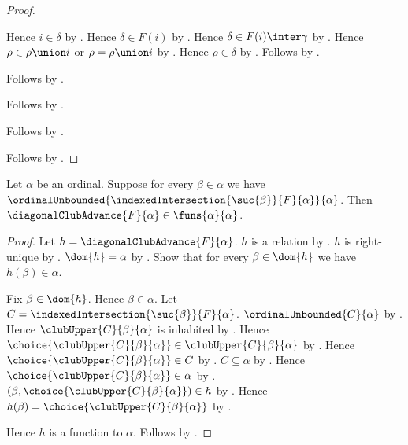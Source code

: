 \begin{proof}
\begin{subproof}
\begin{subproof}
\begin{subproof}
\begin{subproof}
                    Hence $i\in\delta$ by .
                    Hence $\delta\in F(i)$
                        by .
                    Hence $\delta\in F(i)\inter\gamma$
                        by .
                    Hence $\rho\in\rho\union i$ or $\rho=\rho\union i$
                        by .
                    Hence $\rho\in\delta$ by .
                    Follows by \auto.
                \end{subproof}
                Follows by .
            \end{subproof}
            Follows by .
        \end{subproof}
        Follows by .
    \end{subproof}
    Follows by .
\end{proof}

\begin{theorem}\label{diagonal_club_advance_type}
    Let $\alpha$ be an ordinal.
    Suppose for every $\beta\in\alpha$ we have
        $\ordinalUnbounded{
            \indexedIntersection{\suc{\beta}}{F}{\alpha}}{\alpha}$.
    Then $\diagonalClubAdvance{F}{\alpha}\in\funs{\alpha}{\alpha}$.
\end{theorem}
\begin{proof}
    Let $h=\diagonalClubAdvance{F}{\alpha}$.
    $h$ is a relation by .
    $h$ is right-unique
        by .
    $\dom{h}=\alpha$
        by .
    Show that for every $\beta\in\dom{h}$ we have $h(\beta)\in\alpha$.
    \begin{subproof}
        Fix $\beta\in\dom{h}$.
        Hence $\beta\in\alpha$.
        Let $C=\indexedIntersection{\suc{\beta}}{F}{\alpha}$.
        $\ordinalUnbounded{C}{\alpha}$ by \auto.
        Hence $\clubUpper{C}{\beta}{\alpha}$ is inhabited
            by .
        Hence $\choice{\clubUpper{C}{\beta}{\alpha}}
            \in\clubUpper{C}{\beta}{\alpha}$ by .
        Hence $\choice{\clubUpper{C}{\beta}{\alpha}}\in C$
            by .
        $C\subseteq\alpha$ by .
        Hence $\choice{\clubUpper{C}{\beta}{\alpha}}\in\alpha$
            by .
        $(\beta,\choice{\clubUpper{C}{\beta}{\alpha}})\in h$
            by .
        Hence $h(\beta)=\choice{\clubUpper{C}{\beta}{\alpha}}$
            by .
    \end{subproof}
    Hence $h$ is a function to $\alpha$.
    Follows by .
\end{proof}

